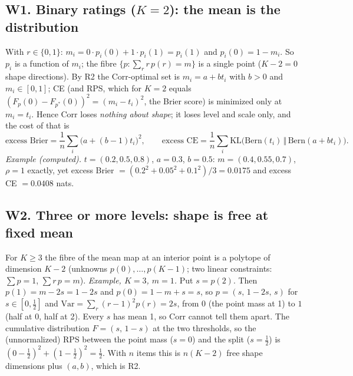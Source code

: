 \documentclass[11pt]{article}
\begin{document}
\subsection*{W1. Binary ratings ($K=2$): the mean is the distribution}
With $r\in\{0,1\}$: $m_i=0\cdot p_i(0)+1\cdot p_i(1)=p_i(1)$ and $p_i(0)=1-m_i$. So $p_i$ is a function of $m_i$; the fibre $\{p:\sum_r r\,p(r)=m\}$ is a single point ($K-2=0$ shape directions). By R2 the Corr-optimal set is $m_i=a+bt_i$ with $b>0$ and $m_i\in[0,1]$; CE (and RPS, which for $K=2$ equals $(F_p(0)-F_{p^\ast}(0))^2=(m_i-t_i)^2$, the Brier score) is minimized only at $m_i=t_i$. Hence Corr loses \emph{nothing about shape}; it loses level and scale only, and the cost of that is
\[
\text{excess Brier}=\frac1n\sum_i\big(a+(b-1)t_i\big)^2,\qquad
\text{excess CE}=\frac1n\sum_i \mathrm{KL}\big(\mathrm{Bern}(t_i)\,\Vert\,\mathrm{Bern}(a+bt_i)\big).
\]
\emph{Example (computed).} $t=(0.2,0.5,0.8)$, $a=0.3$, $b=0.5$: $m=(0.4,0.55,0.7)$, $\rho=1$ exactly, yet excess Brier $=(0.2^2+0.05^2+0.1^2)/3=0.0175$ and excess CE $=0.0408$ nats.

\subsection*{W2. Three or more levels: shape is free at fixed mean}
For $K\ge3$ the fibre of the mean map at an interior point is a polytope of dimension $K-2$ (unknowns $p(0),\dots,p(K-1)$; two linear constraints: $\sum p=1$, $\sum r\,p=m$). \emph{Example, $K=3$, $m=1$.} Put $s=p(2)$. Then $p(1)=m-2s=1-2s$ and $p(0)=1-m+s=s$, so $p=(s,\,1-2s,\,s)$ for $s\in[0,\tfrac12]$ and $\mathrm{Var}=\sum_r (r-1)^2p(r)=2s$, from $0$ (the point mass at 1) to $1$ (half at 0, half at 2). Every $s$ has mean 1, so Corr cannot tell them apart. The cumulative distribution $F=(s,\,1-s)$ at the two thresholds, so the (unnormalized) RPS between the point mass ($s=0$) and the split ($s=\tfrac12$) is $(0-\tfrac12)^2+(1-\tfrac12)^2=\tfrac12$. With $n$ items this is $n(K-2)$ free shape dimensions plus $(a,b)$, which is R2.
\end{document}
